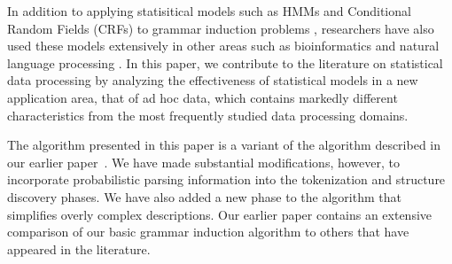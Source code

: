 %

In addition to applying statisitical models such as HMMs and Conditional
Random Fields (CRFs) to grammar induction problems 
\cite{borkar+:text-segmentation,Pinto+:texttables}, researchers have also
used these models extensively in other areas such as bioinformatics 
\cite{kulp96generalized} and natural language processing \cite{Heeman99:speech}.  
In this paper, we contribute to the literature on statistical
data processing by analyzing the effectiveness of statistical models
in a new application area, that of ad hoc data, which contains
markedly different characteristics from the most frequently studied
data processing domains.

The algorithm presented in this paper is a variant of the algorithm described
in our earlier paper~\cite{fisher+:dirttoshovels}.  We have made
substantial modifications, however, to incorporate probabilistic
parsing information into the tokenization and structure discovery
phases.  We have also added a new phase to the algorithm that
simplifies overly complex descriptions. Our earlier paper contains an
extensive comparison of our basic grammar induction
algorithm to others that have appeared in the literature.

